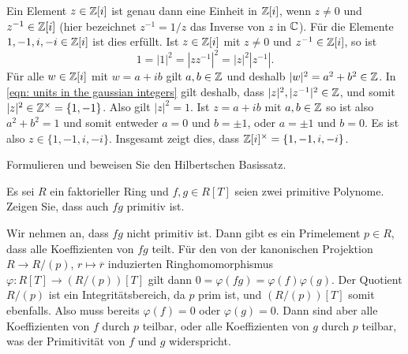 \begin{solution}
  Ein Element $z \in \mathbb{Z}[i]$ ist genau dann eine Einheit in $\mathbb{Z}[i]$, wenn $z \neq 0$ und $z^{-1} \in \mathbb{Z}[i]$ (hier bezeichnet $z^{-1} = 1/z$ das Inverse von $z$ in $\mathbb{C}$).
  Für die Elemente $1, -1, i, -i \in \mathbb{Z}[i]$ ist dies erfüllt.
  Ist $z \in \mathbb{Z}[i]$ mit $z \neq 0$ und $z^{-1} \in \mathbb{Z}[i]$, so ist
  \begin{equation}
    \label{eqn: units in the gaussian integers}
      1
    = |1|^2
    = |z z^{-1}|^2
    = |z|^2 |z^{-1}|.
  \end{equation}
  Für alle $w \in \mathbb{Z}[i]$ mit $w = a + ib$ gilt $a, b \in \mathbb{Z}$ und deshalb $|w|^2 = a^2 + b^2 \in \mathbb{Z}$.
  In \eqref{eqn: units in the gaussian integers} gilt deshalb, dass $|z|^2, |z^{-1}|^2 \in \mathbb{Z}$, und somit $|z|^2 \in \mathbb{Z}^\times = \{1,-1\}$.
  Also gilt $|z|^2 = 1$.
  Ist $z = a + ib$ mit $a,b \in \mathbb{Z}$ so ist also $a^2 + b^2 = 1$ und somit entweder $a = 0$ und $b = \pm 1$, oder $a = \pm 1$ und $b = 0$.
  Es ist also $z \in \{1, -1, i, -i\}$.
  Insgesamt zeigt dies, dass $\mathbb{Z}[i]^\times = \{1, -1, i, -i\}$.
\end{solution}


\begin{question}
  Formulieren und beweisen Sie den Hilbertschen Basissatz.
\end{question}




\begin{question}[subtitle = Ein Lemma von Gauß]
  Es sei $R$ ein faktorieller Ring und $f, g \in R[T]$ seien zwei primitive Polynome.
  Zeigen Sie, dass auch $fg$ primitiv ist.
\end{question}


\begin{question}
  Wir nehmen an, dass $fg$ nicht primitiv ist.
  Dann gibt es ein Primelement $p \in R$, dass alle Koeffizienten von $fg$ teilt.
  Für den von der kanonischen Projektion $R \to R/(p)$, $r \mapsto \overline{r}$ induzierten Ringhomomorphismus $\varphi \colon R[T] \to (R/(p))[T]$ gilt dann $0 = \varphi(fg) = \varphi(f) \varphi(g)$.
  Der Quotient $R/(p)$ ist ein Integritätsbereich, da $p$ prim ist, und $(R/(p))[T]$ somit ebenfalls.
  Also muss bereits $\varphi(f) = 0$ oder $\varphi(g) = 0$.
  Dann sind aber alle Koeffizienten von $f$ durch $p$ teilbar, oder alle Koeffizienten von $g$ durch $p$ teilbar, was der Primitivität von $f$ und $g$ widerspricht.
\end{question}


